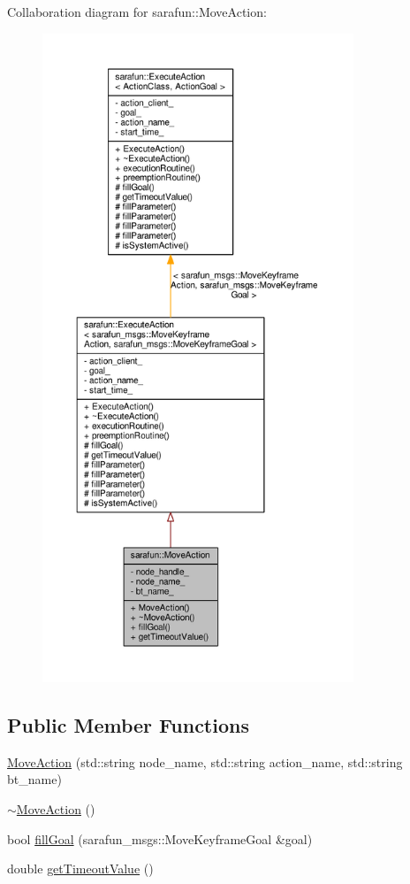 Collaboration diagram for sarafun\-:\-:Move\-Action\-:\nopagebreak
\begin{figure}[H]
\begin{center}
\leavevmode
\includegraphics[height=550pt]{dd/d62/classsarafun_1_1MoveAction__coll__graph}
\end{center}
\end{figure}
\subsection*{Public Member Functions}
\begin{DoxyCompactItemize}
\item 
\hyperlink{classsarafun_1_1MoveAction_a423d16aa9d5a47e9f558eae9e013c5e7_a423d16aa9d5a47e9f558eae9e013c5e7}{Move\-Action} (std\-::string node\-\_\-name, std\-::string action\-\_\-name, std\-::string bt\-\_\-name)
\item 
\hyperlink{classsarafun_1_1MoveAction_ab9b7f0e483bd9a0b53f9651d661c93b7_ab9b7f0e483bd9a0b53f9651d661c93b7}{$\sim$\-Move\-Action} ()
\item 
bool \hyperlink{classsarafun_1_1MoveAction_ad5259389b6a5718389c24fab920c9296_ad5259389b6a5718389c24fab920c9296}{fill\-Goal} (sarafun\-\_\-msgs\-::\-Move\-Keyframe\-Goal \&goal)
\item 
double \hyperlink{classsarafun_1_1MoveAction_a3a0d4d2919b30b878c603a884db6a470_a3a0d4d2919b30b878c603a884db6a470}{get\-Timeout\-Value} ()
\end{DoxyCompactItemize}
